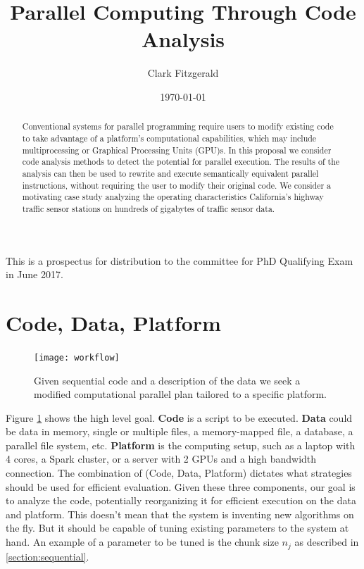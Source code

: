 \documentclass[12pt]{article}
\begin{document}
\title{Parallel Computing Through Code Analysis}
\date{\today}
\author{Clark Fitzgerald}
\maketitle

\begin{abstract}

    Conventional systems for parallel programming require users to modify
    existing code to take advantage of a platform's computational
    capabilities, which may include multiprocessing or Graphical Processing
    Units (GPU)s. In this proposal we consider code analysis methods to
    detect the potential for parallel execution. The results of the
    analysis can then be used to rewrite and execute semantically
    equivalent parallel instructions, without requiring the user to modify
    their original code.  We consider a motivating case study analyzing the
    operating characteristics California's highway traffic sensor stations
    on hundreds of gigabytes of traffic sensor data.

\end{abstract}

This is a prospectus for distribution to the committee for PhD
Qualifying Exam in June 2017.

\section{Code, Data, Platform}

\begin{figure}
\centering
\texttt{[image: workflow]}
\caption{Given sequential code and a description of the data we seek
    a modified computational parallel plan tailored to a specific platform.}
\label{fig:workflow}
\end{figure}

Figure \ref{fig:workflow} shows the high level goal.
\textbf{Code} is a script to be executed.
\textbf{Data} could be data in memory, single or multiple files, a
memory-mapped file, a database, a parallel file system, etc.
\textbf{Platform} is the computing setup, such as a laptop with 4 cores, a
Spark cluster, or a server with 2 GPUs and a high bandwidth connection. The combination
of (Code, Data, Platform) dictates what strategies should be used for
efficient evaluation. Given these three components, our goal is to analyze the
code, potentially reorganizing it for efficient execution on the data and
platform. This doesn't mean that the system is inventing new algorithms on
the fly. But it should be capable of tuning existing parameters to the
system at hand. An example of a parameter to be tuned is the chunk size
$n_j$ as described in \ref{section:sequential}.
\end{document}
